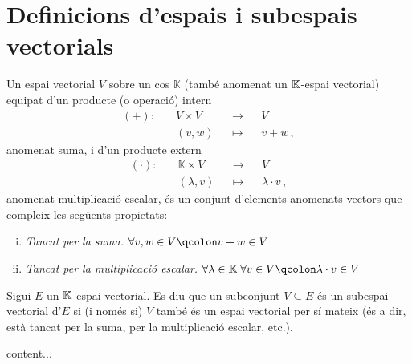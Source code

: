 \section{Definicions d'espais i subespais vectorials}
\begin{defi}
	Un espai vectorial $V$ sobre un cos $\mathbb{K}$ (també anomenat un $\mathbb{K}$-espai vectorial) equipat d'un producte (o operació) intern
	\begin{equation*}
	\begin{aligned}
		(+)\colon\quad	&V\times V &&\rightarrow&& V\\
						&(v,w) &&\mapsto&& v+w \,,
	\end{aligned}
	\end{equation*}
	anomenat suma, i d'un producte extern
	\begin{equation*}
	\begin{aligned}
		(\cdot)\colon\quad	&\mathbb{K}\times V &&\rightarrow&& V\\
							&(\lambda,v) &&\mapsto&& \lambda\cdot v\,,
	\end{aligned}
	\end{equation*} 
	anomenat multiplicació escalar, és un conjunt d'elements anomenats vectors que compleix les següents propietats:
	\begin{enumerate}[i)]
		\item \textit{Tancat per la suma.} $\forall v,w \in V\qcolon v+w\in V$
		\item \textit{Tancat per la multiplicació escalar.} $\forall \lambda \in \mathbb{K}\; \forall v \in V\qcolon \lambda\cdot v\in V$
	\end{enumerate}
\end{defi}

\begin{defi}
	Sigui $E$ un $\mathbb{K}$-espai vectorial. Es diu que un subconjunt $V\subseteq E$ és un subespai vectorial d'$E$ si (i només si) $V$ també és un espai vectorial per sí mateix (és a dir, està tancat per la suma, per la multiplicació escalar, etc.).
\end{defi}

\begin{prop}
	content...
\end{prop}